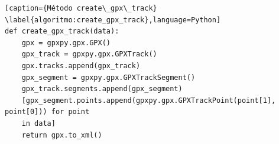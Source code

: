 \begin{lstlisting}[caption={Método create\_gpx\_track}
\label{algoritmo:create_gpx_track},language=Python] 
def create_gpx_track(data):
    gpx = gpxpy.gpx.GPX()
    gpx_track = gpxpy.gpx.GPXTrack()
    gpx.tracks.append(gpx_track)
    gpx_segment = gpxpy.gpx.GPXTrackSegment()
    gpx_track.segments.append(gpx_segment)
    [gpx_segment.points.append(gpxpy.gpx.GPXTrackPoint(point[1], point[0])) for point 
    in data]
    return gpx.to_xml()
\end{lstlisting}